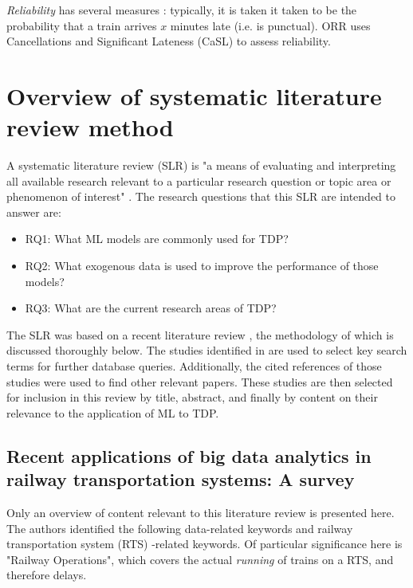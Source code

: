 \documentclass{article}
\begin{document}
\textit{Reliability} has several measures \cite{rietveld_bruinsma_van_vuuren_2001}: typically, it is taken it taken to be the probability that a train arrives $x$ minutes late (i.e. is punctual). ORR uses Cancellations and Significant Lateness (CaSL) to assess reliability.

\clearpage
\section{Overview of systematic literature review method}

A systematic literature review (SLR) is "a means of evaluating and interpreting all available research relevant to a particular research question or topic area or phenomenon of interest" \cite{williams_hollingsworth_2005}. The research questions that this SLR are intended to answer are:

\begin{itemize}
	\item RQ1: What ML models are commonly used for TDP?
	\item RQ2: What exogenous data is used to improve the performance of those models?
	\item RQ3: What are the current research areas of TDP?
\end{itemize}

The SLR was based on a recent literature review \cite{ghofrani_et_al_2018}, the methodology of which is discussed thoroughly below. The studies identified in \cite{ghofrani_et_al_2018} are used to select key search terms for further database queries. Additionally, the cited references of those studies were used to find other relevant papers. These studies are then selected for inclusion in this review by title, abstract, and finally by content on their relevance to the application of ML to TDP.

\subsection{Recent applications of big data analytics in railway transportation systems: A survey \cite{ghofrani_et_al_2018}}

Only an overview of content relevant to this literature review is presented here.
The authors identified the following data-related keywords and railway transportation system (RTS) -related keywords. Of particular significance here is "Railway Operations", which covers the actual \textit{running} of trains on a RTS, and therefore delays. 
\end{document}
